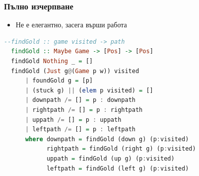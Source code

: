 \documentclass{beamer}
\begin{document}
\begin{frame}[fragile]
  \frametitle{Пълно изчерпване}


     
\begin{itemize}
  \item Не е елегантно, засега върши работа
\end{itemize}

\begin{lstlisting}[basicstyle=\small,language=Haskell]
  --findGold :: game visited -> path
  findGold :: Maybe Game -> [Pos] -> [Pos]
  findGold Nothing _ = []
  findGold (Just g@(Game p w)) visited
      | foundGold g = [p]
      | (stuck g) || (elem p visited) = []
      | downpath /= [] = p : downpath
      | rightpath /= [] = p : rightpath
      | uppath /= [] = p : uppath
      | leftpath /= [] = p : leftpath
      where downpath = findGold (down g) (p:visited)
            rightpath = findGold (right g) (p:visited)
            uppath = findGold (up g) (p:visited)
            leftpath = findGold (left g) (p:visited)  
\end{lstlisting}
  

\end{frame}
\end{document}
